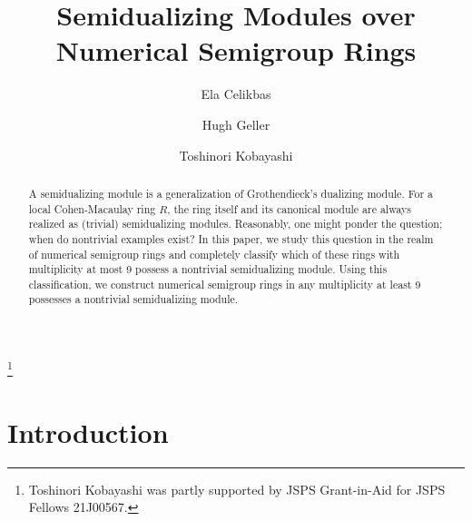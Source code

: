 \documentclass{amsart}
\theoremstyle{plain}
\theoremstyle{definition}
\numberwithin{theorem}{section}
\numberwithin{equation}{section}
\numberwithin{equation}{theorem}
\begin{document}
\title{Semidualizing Modules over Numerical Semigroup Rings}
\author[Ela Celikbas]{Ela Celikbas}
\address{Ela Celikbas \\ School of Mathematical and Data Sciences, West Virginia University, Morgantown, WV 26506, USA.}

\author[Hugh Geller]{Hugh Geller}
\address{Hugh Geller \\ School of Mathematical and Data Sciences, West Virginia University, Morgantown, WV 26506, USA.}

\author[Toshinori Kobayashi]{Toshinori Kobayashi}
\address{Toshinori Kobayashi \\ School of Science and Technology, Meiji University, 1-1-1 Higashi-Mita, Tama-ku, Kawasaki-shi, Kanagawa 214-8571, Japan.}


\thanks{Toshinori Kobayashi was partly supported by JSPS Grant-in-Aid for JSPS Fellows 21J00567.} 

\begin{abstract}
A semidualizing module is a generalization of Grothendieck's dualizing module. For a local Cohen-Macaulay ring $R$, the ring itself and its canonical module are always realized as (trivial) semidualizing modules. Reasonably, one might ponder the question; when do nontrivial examples exist? In this paper, we study this question in the realm of numerical semigroup rings and completely classify which of these rings with multiplicity at most 9 possess a nontrivial semidualizing module. Using this classification, we construct numerical semigroup rings in any multiplicity at least 9 possesses a nontrivial semidualizing module.
\end{abstract}

\maketitle

\section{Introduction}
\end{document}
